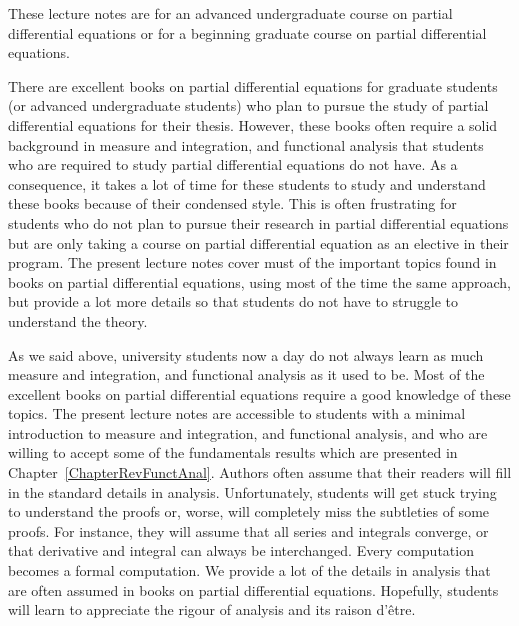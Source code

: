 
These lecture notes are for an advanced undergraduate course on partial
differential equations or for a beginning graduate course on partial
differential equations. 

There are excellent books on partial differential equations for
graduate students (or advanced undergraduate students) who plan to
pursue the study of partial differential equations for their 
thesis.  However, these books often require a solid
background in measure and integration, and functional analysis that
students who are required to study partial differential equations do
not have.  As a consequence, it takes a lot of time for these students
to study and understand these books because of their condensed style.
This is often frustrating for students who do not plan to pursue
their research in partial differential equations but are only taking a
course on partial differential equation as an elective in their program.  The
present lecture notes cover must of the important topics found in books on
partial differential equations, using most of the time the same 
approach, but provide a lot more details so that students do not have
to struggle to understand the theory.

As we said above,
university students now a day do not always learn as much measure and
integration, and functional analysis as it used to be.  Most of the
excellent books on partial differential equations require a good
knowledge of these topics.  The present lecture notes are accessible to
students with a minimal introduction to measure and integration, and
functional analysis, and who are willing to accept some of the
fundamentals results which are presented in
Chapter~\ref{ChapterRevFunctAnal}.  Authors often assume that their
readers will fill in the standard details in analysis.  Unfortunately,
students will get stuck trying to understand the proofs or, worse,
will completely miss the subtleties of some proofs.  For instance,
they will assume
that all series and integrals converge, or that derivative and
integral can always be interchanged.  Every computation becomes a formal
computation.  We provide a lot of the details in
analysis that are often assumed in books on partial differential
equations.  Hopefully, students will learn to appreciate the rigour of
analysis and its raison d'être.


